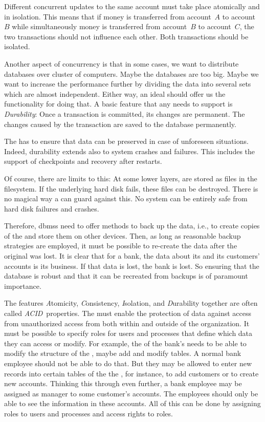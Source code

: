Different concurrent updates to the same account must take place atomically and in isolation.
This means that if money is transferred from account~$A$ to account~$B$ while simultaneously money is transferred from account~$B$ to account~$C$, the two transactions should not influence each other.
Both transactions should be isolated.

Another aspect of concurrency is that in some cases, we want to distribute databases over cluster of computers.
Maybe the databases are too big.
Maybe we want to increase the performance further by dividing the data into several sets which are almost independent.
Either way, an ideal  should offer us the functionality for doing that.%
\endhsection%
%
%
%
A basic feature that any  needs to support is \emph{Durability}:
Once a transaction is committed, its changes are permanent.
The changes caused by the transaction are saved to the database permanently.

The  has to ensure that data can be preserved in case of unforeseen situations.
Indeed, durability extends also to system crashes and failures.
This includes the support of checkpoints and recovery after restarts.

Of course, there are limits to this:
At some lower layers,  are stored as files in the filesystem.
If the underlying hard disk fails, these files can be destroyed.
There is no magical way a  can guard against this.
No system can be entirely safe from hard disk failures and crashes.

Therefore, \glspl{dbms} need to offer methods to back up the data, i.e., to create copies of the  and store them on other devices.
Then, as long as reasonable backup strategies are employed, it must be possible to re-create the data after the original  was lost.
It is clear that for a bank, the data about its and its customers' accounts is its business.
If that data is lost, the bank is lost.
So ensuring that the database is robust and that it can be recreated from backups is of paramount importance.%
\endhsection%

The features \emph{A}tomicity, \emph{C}onsistency, \emph{I}solation, and \emph{D}urability together are often called \emph{ACID}~properties.
%
\label{sec:featuresDataPrivacyAndSecurity}%
The  must enable the protection of data against access from unauthorized access from both within and outside of the organization.
It must be possible to specify roles for users and processes that define which data they can access or modify.
For example, the  of the bank's  needs to be able to modify the structure of the , maybe add and modify tables.
A normal bank employee should not be able to do that.
But they may be allowed to enter new records into certain tables of the the , for instance, to add customers or to create new accounts.
Thinking this through even further, a bank employee may be assigned as manager to some customer's accounts.
The employees should only be able to see the information in these accounts.
All of this can be done by assigning roles to users and processes and access rights to roles.

